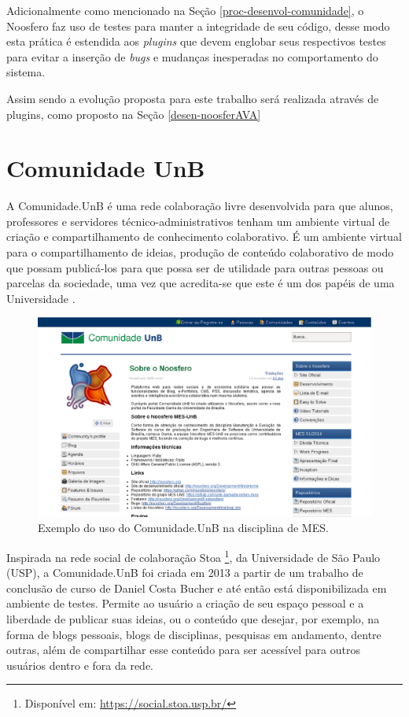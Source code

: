 Adicionalmente como mencionado na Seção \ref{proc-desenvol-comunidade}, o Noosfero faz uso de testes para manter a integridade de seu código, desse modo esta prática é estendida aos \textit{plugins} que devem englobar seus respectivos testes para evitar a inserção de \textit{bugs} e mudanças inesperadas no comportamento do sistema. 

Assim sendo a evolução proposta para este trabalho será realizada através de plugins, como proposto na Seção \ref{desen-noosferAVA}

\section{Comunidade UnB}
\label{comunidade-unb}

A Comunidade.UnB é uma rede colaboração livre desenvolvida para que alunos, professores e servidores técnico-administrativos tenham um ambiente virtual de criação e compartilhamento de conhecimento colaborativo. É um ambiente virtual para o compartilhamento de ideias, produção de conteúdo colaborativo de modo que possam publicá-los para que possa ser de utilidade para outras pessoas ou parcelas da sociedade, uma vez que acredita-se que este é um dos papéis de uma Universidade \cite{bucher2013rede}.

\begin{figure}[!htb]
    \centering
    \includegraphics[keepaspectratio=true,scale=0.4]
      {figuras/comunidade-mes.eps}
    \caption{Exemplo do uso do Comunidade.UnB na disciplina de MES.}
    \label{comunidade-mes}
\end{figure}

Inspirada na rede social de colaboração Stoa \footnote{Disponível em: \url{https://social.stoa.usp.br/}}, da Universidade de São Paulo (USP), a Comunidade.UnB foi criada em 2013 a partir de um trabalho de conclusão de curso de Daniel Costa Bucher e até então está disponibilizada em ambiente de testes. Permite ao usuário a criação de seu espaço pessoal e a liberdade de publicar suas ideias, ou o conteúdo que desejar, por exemplo, na forma de blogs pessoais, blogs de disciplinas, pesquisas em andamento, dentre outras, além de compartilhar esse conteúdo para ser acessível para outros usuários dentro e fora da rede.

